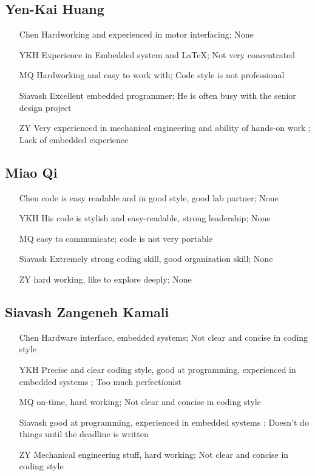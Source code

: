 \documentclass[a4paper]{article}
\begin{document}
\subsection{Yen-Kai Huang}
\begin{itemize}
\item[Chen] Hardworking and experienced in motor interfacing; None
\item[YKH]  Experience in Embedded system and \LaTeX; Not very concentrated
\item[MQ]   Hardworking and easy to work with; Code style is not professional
\item[Siavash] Excellent embedded programmer; He is often busy with the senior design project
\item[ZY]   Very experienced in mechanical engineering and ability of hands-on work ; Lack of embedded experience
\end{itemize}

\subsection{Miao Qi}
\begin{itemize}
\item[Chen]	code is easy readable and in good style, good lab partner; None
\item[YKH]	His code is stylish and easy-readable, strong leadership; None
\item[MQ]	easy to communicate; code is not very portable
\item[Siavash]	Extremely strong coding skill, good organization skill; None
\item[ZY]	hard working, like to explore deeply; None
\end{itemize}

\subsection{Siavash Zangeneh Kamali}
\begin{itemize}
\item[Chen] Hardware interface, embedded systems; Not clear and concise in coding style
\item[YKH] Precise and clear coding style, good at programming, experienced in embedded systems ; Too much perfectionist
\item[MQ] on-time, hard working; Not clear and concise in coding style
\item[Siavash] good at programming, experienced in embedded systems ; Doesn't do things until the deadline is written
\item[ZY] Mechanical engineering stuff, hard working; Not clear and concise in coding style
\end{itemize}
\end{document}
